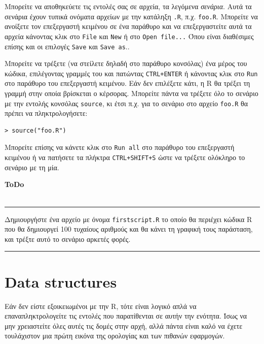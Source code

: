 \documentclass[a4paper,11pt,twocolumn,tablecaptionabove]{scrartcl}
\makeatletter
\newenvironment{ToDo} {%
  \begin{flushright}
    \hfill
    \begin{minipage}{0.95\columnwidth}         %
    \textsf{\textbf{ToDo}} \\
      \vspace{-0.85cm}\\
      {\color{Gray}\rule[-0.1cm]{\columnwidth}{1.5pt}}} { %
      {\color{Gray} \rule[0.3cm]{\columnwidth}{1.5pt}}
    \end{minipage}
    \vspace{1em}
  \end{flushright}
  }
\let\SF@@footnote\footnote
\def\footnote{\ifx\protect\@typeset@protect
 \expandafter\SF@@footnote
 \else
 \expandafter\SF@gobble@opt
 \fi
}
\edef\SF@gobble@opt{\noexpand\protect
 \expandafter\noexpand\csname SF@gobble@opt \endcsname}
\makeatother
\begin{document}
Μπορείτε να αποθηκεύετε τις εντολές σας σε αρχεία, τα λεγόμενα \emph{σενάρια}. Αυτά τα σενάρια έχουν τυπικά
ονόματα αρχείων με την κατάληξη \texttt{.R}, π.χ. \texttt{foo.R}. Μπορείτε να ανοίξετε τον επεξεργαστή κειμένου
σε ένα παράθυρο και να επεξεργαστείτε αυτά τα αρχεία κάνοντας κλικ στο \texttt{File} και \texttt{New} ή στο 
\texttt{Open file...}\footnote{Όπου είναι διαθέσιμες επίσης και οι επιλογές \texttt{Save} και
\texttt{Save as}.}.

Μπορείτε να τρέξετε (να στείλετε δηλαδή στο παράθυρο κονσόλας) ένα μέρος του κώδικα, επιλέγοντας γραμμές του και
πατώντας \texttt{CTRL+ENTER} ή κάνοντας κλικ στο \texttt{Run} στο παράθυρο του επεξεργαστή κειμένου. Εάν δεν
επιλέξετε κάτι, η R θα τρέξει τη γραμμή στην οποία βρίσκεται ο κέρσορας. Μπορείτε πάντα να τρέξετε όλο το
σενάριο με την εντολής κονσόλας \texttt{source}, κι έτσι π.χ. για το σενάριο στο αρχείο \texttt{foo.R} θα πρέπει
να πληκτρολογήσετε:
\begin{Verbatim}[frame=single,gobble=0]
> source("foo.R")
\end{Verbatim}
Μπορείτε επίσης να κάνετε κλικ στο \texttt{Run all} στο παράθυρο του επεξεργαστή κειμένου ή να
πατήσετε τα πλήκτρα \texttt{CTRL+SHIFT+S} ώστε να τρέξετε ολόκληρο το σενάριο με τη μία.

\begin{ToDo}
  Δημιουργήστε ένα αρχείο με όνομα \texttt{firstscript.R} το οποίο θα περιέχει κώδικα R που θα δημιουργεί 100
  τυχαίους αριθμούς και θα κάνει τη γραφική τους παράσταση, και τρέξτε αυτό το σενάριο αρκετές φορές.\\
\end{ToDo}


\section{Data structures} 
\label{sec:structures}

Εάν δεν είστε εξοικειωμένοι με την R, τότε είναι λογικό απλά να επαναπληκτρολογείτε τις εντολές που 
παρατίθενται σε αυτήν την ενότητα. Ίσως να μην χρειαστείτε όλες αυτές τις δομές στην αρχή, αλλά πάντα
είναι καλό να έχετε τουλάχιστον μια πρώτη εικόνα της ορολογίας και των πιθανών εφαρμογών.

\end{document}
